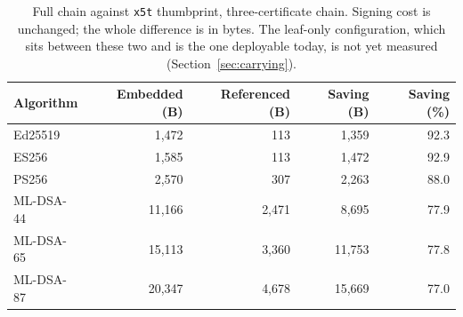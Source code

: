 \begin{table}[t]
\caption{Full chain against \texttt{x5t} thumbprint, three-certificate chain. Signing cost is unchanged; the whole difference is in bytes. The leaf-only configuration, which sits between these two and is the one deployable today, is not yet measured (Section~\ref{sec:carrying}).}
\label{tab:certref}
\begin{tabular}{lrrrr}
\toprule
Algorithm & Embedded (B) & Referenced (B) & Saving (B) & Saving (\%)\\
\midrule
Ed25519 & 1,472 & 113 & 1,359 & 92.3\\
ES256 & 1,585 & 113 & 1,472 & 92.9\\
PS256 & 2,570 & 307 & 2,263 & 88.0\\
ML-DSA-44 & 11,166 & 2,471 & 8,695 & 77.9\\
ML-DSA-65 & 15,113 & 3,360 & 11,753 & 77.8\\
ML-DSA-87 & 20,347 & 4,678 & 15,669 & 77.0\\
\bottomrule
\end{tabular}
\end{table}
